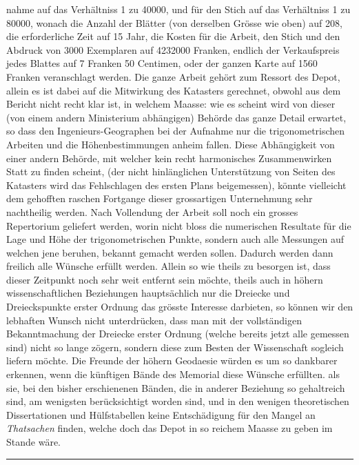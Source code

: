 %
nahme auf das Verhältniss 1 zu 40000, und für den Stich auf das Verhältniss 1 zu 80000, wonach die Anzahl der Blätter (von derselben Grösse wie oben) auf 208, die erforderliche Zeit auf 15 Jahr, die Kosten für die Arbeit, den Stich und den Abdruck von 3000 Exemplaren auf 4232000 Franken, endlich der Verkaufspreis jedes Blattes auf 7 Franken 50 Centimen, oder der ganzen Karte auf 1560 Franken veranschlagt werden. Die ganze Arbeit gehört zum Ressort des Depot, allein es ist dabei auf die Mitwirkung des Katasters gerechnet, obwohl aus dem Bericht nicht recht klar ist, in welchem Maasse: wie es scheint wird von dieser (von einem andern Ministerium abhängigen) Behörde das ganze Detail erwartet, so dass den Ingenieurs-Geographen bei der Aufnahme nur die trigonometrischen Arbeiten und die Höhenbestimmungen anheim fallen. Diese Abhängigkeit von einer andern Behörde, mit welcher kein recht harmonisches Zusammenwirken Statt zu finden scheint, (der nicht hinlänglichen Unterstützung von Seiten des Katasters wird das Fehlschlagen des ersten Plans beigemessen), könnte vielleicht dem gehofften raschen Fortgange dieser grossartigen Unternehmung sehr nachtheilig werden. Nach Vollendung der Arbeit soll noch ein grosses Repertorium geliefert werden, worin nicht bloss die numerischen Resultate für die Lage und Höhe der trigonometrischen Punkte, sondern auch alle Messungen auf welchen jene beruhen, bekannt gemacht werden sollen. Dadurch werden dann freilich alle Wünsche erfüllt werden. Allein so wie theils zu besorgen ist, dass dieser Zeitpunkt noch sehr weit entfernt sein möchte, theils auch in höhern wissenschaftlichen Beziehungen hauptsächlich nur die Dreiecke und Dreieckspunkte erster Ordnung das grösste Interesse darbieten, so können wir den lebhaften Wunsch nicht unterdrücken, dass man mit der vollständigen Bekanntmachung der Dreiecke erster Ordnung (welche bereits jetzt alle gemessen sind) nicht so lange zögern, sondern diese zum Besten der Wissenschaft sogleich liefern möchte. Die Freunde der höhern Geodaesie würden es um so dankbarer erkennen, wenn die künftigen Bände des Memorial diese Wünsche erfüllten. als sie, bei den bisher erschienenen Bänden, die in anderer Beziehung so gehaltreich sind, am wenigsten berücksichtigt worden sind, und in den wenigen theoretischen Dissertationen und Hülfstabellen keine Entschädigung für den Mangel an \textit{Thatsachen} finden, welche doch das Depot in so reichem Maasse zu geben im Stande wäre.
\begin{center}\rule{.3\textwidth}{.3pt}\end{center}
